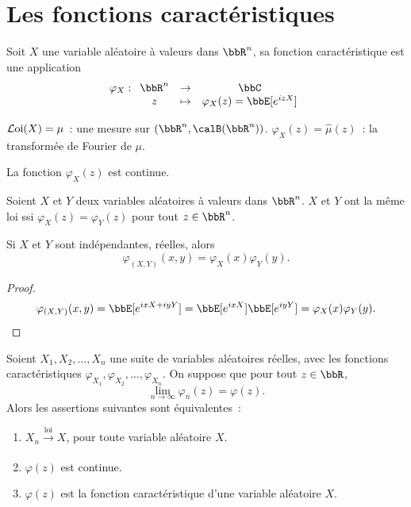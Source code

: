 \section{Les fonctions caractéristiques}

\begin{deff}
    Soit $X$ une variable aléatoire à valeurs dans $\bbR^n$, sa fonction caractéristique est une application
    \[ \varphi_X:
        \begin{array}[t]{ccc}
            \bbR^n & \to & \bbC                         \\
            z      & \tp & \varphi_X(z) = \bbE[e^{izX}]
        \end{array}
    \]
\end{deff}

\begin{rqq}
    $\operatorname{\mathcal{L}oi}(X) = \mu$~: une mesure sur $(\bbR^n, \calB(\bbR^n))$.
    $\varphi_X(z) = \hat{\mu}(z)$~: la transformée de Fourier de $\mu$.
\end{rqq}

\begin{prop}
    La fonction $\varphi_X(z)$ est continue.
\end{prop}

\begin{prop}
    Soient $X$ et $Y$ deux variables aléatoires à valeurs dans $\bbR^n$.
    $X$ et $Y$ ont la même loi ssi $\varphi_X(z) = \varphi_Y(z)$ pour tout $z \in \bbR^n$.
\end{prop}

\begin{prop}
    Si $X$ et $Y$ sont indépendantes, réelles, alors
    \[ \varphi_{(X, Y)}(x, y) = \varphi_X(x) \varphi_Y(y). \]
\end{prop}

\begin{proof}
    \[ \varphi_{(X, Y)}(x, y) = \bbE[e^{ixX + iyY}] = \bbE[e^{ixX}] \bbE[e^{iyY}] = \varphi_X(x) \varphi_Y(y). \]
\end{proof}

\begin{thm}
    Soient $X_1, X_2, \ldots, X_n$ une suite de variables aléatoires réelles,
    avec les fonctions caractéristiques $\varphi_{X_1}, \varphi_{X_2}, \ldots, \varphi_{X_n}$.
    On suppose que pour tout $z \in \bbR$,
    \[ \lim_{n \to \infty} \varphi_n(z) = \varphi(z). \]
    Alors les assertions suivantes sont équivalentes~:
    \begin{enumerate}
        \item $X_n \xrightarrow[]{\text{loi}} X$, pour toute variable aléatoire $X$.
        \item $\varphi(z)$ est continue.
        \item $\varphi(z)$ est la fonction caractéristique d'une variable aléatoire $X$.
    \end{enumerate}
\end{thm}

